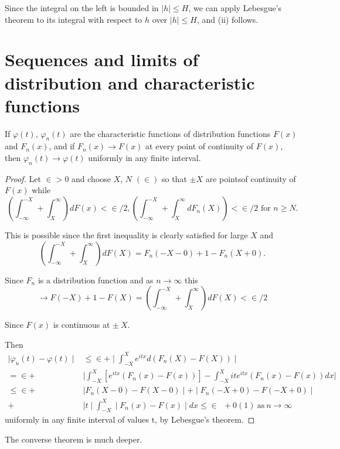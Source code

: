 Since the integral on the left is bounded in $\mid h \mid \le H$,
we can apply Lebesgue's theorem to its integral with respect 
to $h$ over $\mid  h \mid \le H$, and (ii) follows. 


\section[Sequences and limits of...]{Sequences and limits of distribution and
    characteristic functions}\label{chap2:sec6} 

\begin{theorem}\label{chap2:sec6:thm15}  %
  If $\varphi (t)$, $\varphi_n (t)$ are the characteristic functions
  of distribution functions $F(x)$ and $F_n (x)$, and if
  $F_n (x)\rightarrow F(x)$ at  
  every point of continuity of $F(x)$, then $\varphi_n (t) \rightarrow
  \varphi (t)$ uniformly in  
  any finite interval.
\end{theorem}

\begin{proof}
  Let  $\in > 0$ and choose $X$, $N$ $(\in)$ so that $\pm X$ are 
  points\pageoriginale of continuity of $F(x)$ while
  $$
  \left(\int^{-X}_{- \infty} + \int^{\infty}_{X}\right) d  F(x) < \in/2,
  \left(\int^{-X}_{- \infty} + \int^{\infty}_{X} d F_n(X)\right) < \in/2  
  \text{ for }n \ge N. 
  $$
  
  This is possible since the first inequality is clearly satisfied for
  large $X$ and 
  $$
  \left(\int^{-X}_{- \infty} + \int^{\infty}_{X}\right) d F (X) = F_n (-X-0)
  + 1 - F_n (X + 0).
  $$ 
  
  Since $F_n$ is a distribution function and as $n \rightarrow \infty$ this
  $$
  \rightarrow F(-X) + 1 - F (X) = \left(\int^{-X}_{- \infty} +
  \int^{\infty}_X\right) dF (X) < \in/2 
  $$
  
  Since $F(x)$ is continuous at $\pm ~X$.
  
  Then 
  \begin{align*}
    \mid \varphi_n(t) - \varphi(t)\mid & \le \in + \mid
    \int^X_{-X}e^{itx} d(F_n(X)-F(X)) \mid\\
    = \in + &\bigg| \int^X_{-X} \left[e^{itx} (F_n(x)-F(x))\right]-
    \int^X_{-X} ite^{itx}(F_n(x)-F(x))dx \bigg| \\ 
    \le  \in  + &\mid F_n (X-0) - F(X-0) \mid + \mid F_n (-X+0) - F(-X+0) \mid\\
    + & \mid t \mid \int^X_{-X} \mid F_n (x)-F(x)\mid dx
    \le \in ~~+ 0 (1) ~\text {as}~ n \rightarrow \infty
  \end{align*}
  uniformly in any finite interval of values t, by Lebesgue's theorem. 
\end{proof}
 The converse theorem is much deeper.
 
